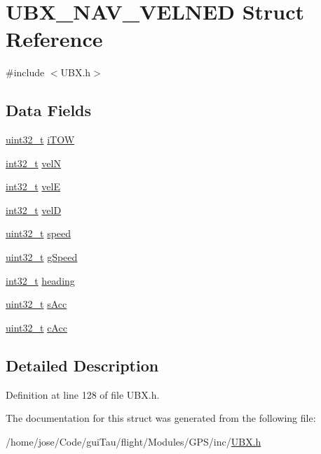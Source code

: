 \hypertarget{struct_u_b_x___n_a_v___v_e_l_n_e_d}{\section{U\-B\-X\-\_\-\-N\-A\-V\-\_\-\-V\-E\-L\-N\-E\-D Struct Reference}
\label{struct_u_b_x___n_a_v___v_e_l_n_e_d}
}


{\ttfamily \#include $<$U\-B\-X.\-h$>$}

\subsection*{Data Fields}
\begin{DoxyCompactItemize}
\item 
\hyperlink{stdint_8h_a435d1572bf3f880d55459d9805097f62}{uint32\-\_\-t} \hyperlink{group___g_s_p_module_gaf2aa06ea75e992d2933728a9eb390734}{i\-T\-O\-W}
\item 
\hyperlink{group___n_a_m_e_gafd12020da5a235dfcf0c3c748fb5baed}{int32\-\_\-t} \hyperlink{group___g_s_p_module_gab9c0e5be2137b6287caa0d98942c521d}{vel\-N}
\item 
\hyperlink{group___n_a_m_e_gafd12020da5a235dfcf0c3c748fb5baed}{int32\-\_\-t} \hyperlink{group___g_s_p_module_ga6a8d3e61f2818644777283c0ea93dec8}{vel\-E}
\item 
\hyperlink{group___n_a_m_e_gafd12020da5a235dfcf0c3c748fb5baed}{int32\-\_\-t} \hyperlink{group___g_s_p_module_ga3dcace94a7b7317b432bcdeb69271326}{vel\-D}
\item 
\hyperlink{stdint_8h_a435d1572bf3f880d55459d9805097f62}{uint32\-\_\-t} \hyperlink{group___g_s_p_module_ga16a2a64917c6151546e60e1eb04eb4f6}{speed}
\item 
\hyperlink{stdint_8h_a435d1572bf3f880d55459d9805097f62}{uint32\-\_\-t} \hyperlink{group___g_s_p_module_ga1c5f6e6ddf0495f4c308b520ae809266}{g\-Speed}
\item 
\hyperlink{group___n_a_m_e_gafd12020da5a235dfcf0c3c748fb5baed}{int32\-\_\-t} \hyperlink{group___g_s_p_module_ga1e0129270ba7fdbba7e441e60cefa8a7}{heading}
\item 
\hyperlink{stdint_8h_a435d1572bf3f880d55459d9805097f62}{uint32\-\_\-t} \hyperlink{group___g_s_p_module_ga50bfd12e0c7398ab16e312e6a9332e7d}{s\-Acc}
\item 
\hyperlink{stdint_8h_a435d1572bf3f880d55459d9805097f62}{uint32\-\_\-t} \hyperlink{group___g_s_p_module_ga8740fa2ac06cfb2d09b132c973a99887}{c\-Acc}
\end{DoxyCompactItemize}


\subsection{Detailed Description}


Definition at line 128 of file U\-B\-X.\-h.



The documentation for this struct was generated from the following file\-:\begin{DoxyCompactItemize}
\item 
/home/jose/\-Code/gui\-Tau/flight/\-Modules/\-G\-P\-S/inc/\hyperlink{_u_b_x_8h}{U\-B\-X.\-h}\end{DoxyCompactItemize}
